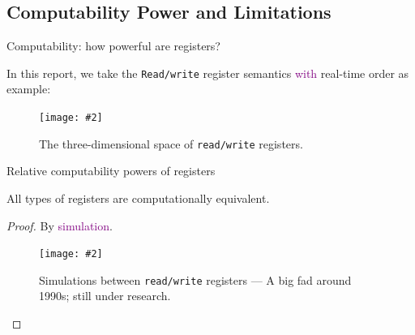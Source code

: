\documentclass{beamer}
\makeatletter
\newcommand{\citeinbeamer}[3]{{\scriptsize{\textcolor{blue}{[#1@#2'#3]}}}}
\newcommand{\fig}[3]
{
  \begin{figure}[htp]
    \centering
      \texttt{[image: \#2]}
      \caption[labelInTOC]{#3}
  \end{figure}
}
\newcommand{\largepurple}[1]{\textcolor{purple}{\large #1}}
\newcommand{\blue}[1]{\textcolor{blue}{#1}}
\newcommand{\red}[1]{\textcolor{red}{#1}}
\makeatother
\begin{document}
\subsection{Computability Power and Limitations}

\begin{frame}{Computability: how powerful are registers?}
  \begin{block}{In this report, we take the \texttt{Read/write} register
  semantics \largepurple{with} real-time order as example:}
    \fig{width = 0.50\textwidth}{fig/space-of-registers.pdf}
    {The three-dimensional space of \texttt{read/write} registers.}
  \end{block}
\end{frame}

\begin{frame}{Relative computability powers of registers}
  \begin{theorem}
  All types of registers are computationally equivalent.
  \end{theorem}

  \begin{proof}
    By \largepurple{simulation}.
    \fig{width = 0.618\textwidth}{fig/simulation_readwrite_register.pdf}{Simulations
    between \texttt{read/write} registers --- A big fad around 1990s; still
    under research.}
  \end{proof}
\end{frame}
\end{document}
